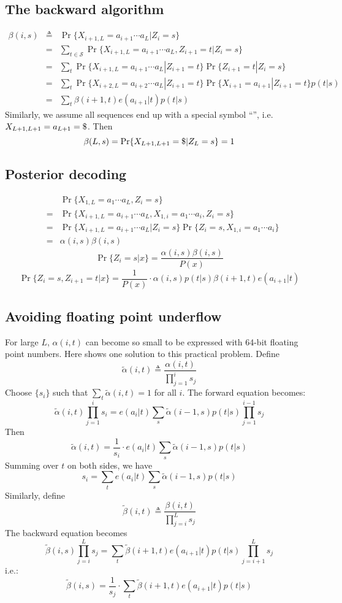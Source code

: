 \documentclass[10pt]{article}
\begin{document}
\subsection{The backward algorithm}
\begin{eqnarray*}
\beta(i,s)&\triangleq&\Pr\{X_{i+1,L}=a_{i+1}\cdots a_L|Z_i=s\}\\
&=&\sum_{t\in\mathcal{S}}\Pr\{X_{i+1,L}=a_{i+1}\cdots a_L,Z_{i+1}=t|Z_i=s\}\\
&=&\sum_t\Pr\{X_{i+1,L}=a_{i+1}\cdots a_L|Z_{i+1}=t\}\Pr\{Z_{i+1}=t|Z_i=s\}\\
&=&\sum_t\Pr\{X_{i+2,L}=a_{i+2}\cdots a_L|Z_{i+1}=t\}\Pr\{X_{i+1}=a_{i+1}|Z_{i+1}=t\}p(t|s)\\
&=&\sum_t\beta(i+1,t)e(a_{i+1}|t)p(t|s)
\end{eqnarray*}
Similarly, we assume all sequences end up with a special symbol
``{\tt{}}'', i.e. $X_{L+1,L+1}=a_{L+1}={\tt\char36}$. Then
$$
\beta(L,s)=\Pr\{X_{L+1,L+1}={\tt\char36}|Z_L=s\}=1
$$

\subsection{Posterior decoding}
\begin{eqnarray*}
&& \Pr\{X_{1,L}=a_1\cdots a_L,Z_i=s\}\\
&=&\Pr\{X_{i+1,L}=a_{i+1}\cdots a_L,X_{1,i}=a_1\cdots a_i,Z_i=s\}\\
&=&\Pr\{X_{i+1,L}=a_{i+1}\cdots a_L|Z_i=s\}\Pr\{Z_i=s,X_{1,i}=a_1\cdots a_i\}\\
&=&\alpha(i,s)\beta(i,s)
\end{eqnarray*}
$$
\Pr\{Z_i=s|x\}=\frac{\alpha(i,s)\beta(i,s)}{P(x)}
$$
$$
\Pr\{Z_i=s,Z_{i+1}=t|x\}=\frac{1}{P(x)}\cdot\alpha(i,s)p(t|s)\beta(i+1,t)e(a_{i+1}|t)
$$

\subsection{Avoiding floating point underflow}

For large $L$, $\alpha(i,t)$ can become so small to be expressed with 64-bit
floating point numbers. Here shows one solution to this practical problem.
Define
$$
\tilde{\alpha}(i,t)\triangleq\frac{\alpha(i,t)}{\prod_{j=1}^is_j}
$$
Choose $\{s_i\}$ such that $\sum_t\tilde{\alpha}(i,t)=1$ for all $i$. The
forward equation becomes:
$$
\tilde{\alpha}(i,t)\prod_{j=1}^is_i=e(a_i|t)\sum_s\tilde{\alpha}(i-1,s)p(t|s)\prod_{j=1}^{i-1}s_j
$$
Then
$$
\tilde{\alpha}(i,t)=\frac{1}{s_i}\cdot e(a_i|t)\sum_s\tilde{\alpha}(i-1,s)p(t|s)
$$
Summing over $t$ on both sides, we have
$$
s_i=\sum_te(a_i|t)\sum_s\tilde{\alpha}(i-1,s)p(t|s)
$$
Similarly, define
$$
\tilde{\beta}(i,t)\triangleq\frac{\beta(i,t)}{\prod_{j=i}^Ls_j}
$$
The backward equation becomes
$$
\tilde{\beta}(i,s)\prod_{j=i}^Ls_j=\sum_t\tilde{\beta}(i+1,t)e(a_{i+1}|t)p(t|s)\prod_{j=i+1}^Ls_j
$$
i.e.:
$$
\tilde{\beta}(i,s)=\frac{1}{s_j}\cdot\sum_t\tilde{\beta}(i+1,t)e(a_{i+1}|t)p(t|s)
$$
\end{document}
